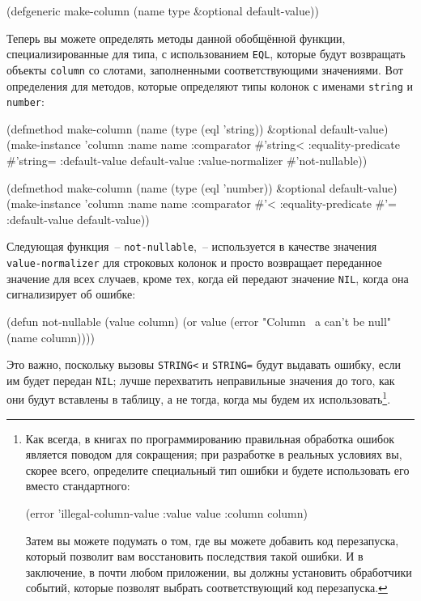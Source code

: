 \begin{myverb}
(defgeneric make-column (name type &optional default-value))
\end{myverb}

Теперь вы можете определять методы данной обобщённой функции, специализированные для типа,
с использованием \lstinline{EQL}, которые будут возвращать объекты \lstinline{column} со слотами,
заполненными соответствующими значениями.  Вот определения для методов, которые определяют
типы колонок с именами \lstinline{string} и \lstinline{number}:

\begin{myverb}
(defmethod make-column (name (type (eql 'string)) &optional default-value)
  (make-instance
   'column 
   :name name
   :comparator #'string< 
   :equality-predicate #'string=
   :default-value default-value
   :value-normalizer #'not-nullable))

(defmethod make-column (name (type (eql 'number)) &optional default-value)
  (make-instance 
   'column
   :name name
   :comparator #'< 
   :equality-predicate #'=
   :default-value default-value))
\end{myverb}

Следующая функция~-- \lstinline{not-nullable},~-- используется в качестве значения
\lstinline{value-normalizer} для строковых колонок и просто возвращает переданное значение для
всех случаев, кроме тех, когда ей передают значение \lstinline{NIL}, когда она сигнализирует об
ошибке:

\begin{myverb}
(defun not-nullable (value column)
  (or value (error "Column ~a can't be null" (name column))))
\end{myverb}

Это важно, поскольку вызовы \lstinline{STRING<} и \lstinline{STRING=} будут выдавать ошибку, если им
будет передан \lstinline{NIL}; лучше перехватить неправильные значения до того, как они будут
вставлены в таблицу, а не тогда, когда мы будем их использовать\footnote{Как всегда, в
  книгах по программированию правильная обработка ошибок является поводом для сокращения;
  при разработке в реальных условиях вы, скорее всего, определите специальный тип ошибки и
  будете использовать его вместо стандартного:

\begin{myverb}
(error 'illegal-column-value :value value :column column)
\end{myverb}

Затем вы можете подумать о том, где вы можете добавить код перезапуска, который позволит
вам восстановить последствия такой ошибки.  И в заключение, в почти любом приложении, вы
должны установить обработчики событий, которые позволят выбрать соответствующий код
перезапуска.}\hspace{\footnotenegspace}.

